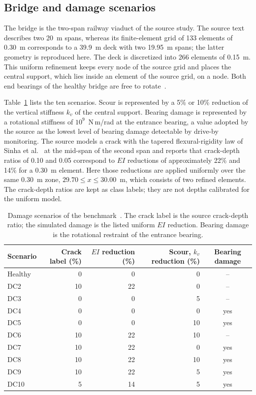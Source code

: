 \subsection{Bridge and damage scenarios}
\label{sec:scenarios}

The bridge is the two-span railway viaduct of the source study. The source text
describes two 20~m spans, whereas its finite-element grid of 133 elements of
0.30~m corresponds to a 39.9~m deck with two 19.95~m spans; the latter geometry
is reproduced here. The deck is discretized into 266 elements of 0.15~m. This
uniform refinement keeps every node of the source grid and places the central
support, which lies inside an element of the source grid, on a node. Both end
bearings of the healthy bridge are free to rotate~\cite{fernandes2025early}.

Table~\ref{tab:f25_scenarios} lists the ten scenarios. Scour is represented by a
5\% or 10\% reduction of the vertical stiffness $k_v$ of the central support.
Bearing damage is represented by a rotational stiffness of $10^{9}$~N\,m/rad at
the entrance bearing, a value adopted by the source as the lowest level of
bearing damage detectable by drive-by monitoring. The source models a crack
with the tapered flexural-rigidity law of Sinha et
al.~\cite{sinha2002simplified} at the mid-span of the second span and reports
that crack-depth ratios of 0.10 and 0.05 correspond to $EI$ reductions of
approximately 22\% and 14\% for a 0.30~m element. Here those reductions are
applied uniformly over the same 0.30~m zone, $29.70\le x\le30.00$~m, which
consists of two refined elements. The crack-depth ratios are kept as class
labels; they are not depths calibrated for the uniform model.

\begin{table}[htbp]
\centering
\caption{Damage scenarios of the benchmark~\cite{fernandes2025early}. The crack
label is the source crack-depth ratio; the simulated damage is the listed
uniform $EI$ reduction. Bearing damage is the rotational restraint of the
entrance bearing.}
\label{tab:f25_scenarios}
\small
\begin{tabular}{lrrrc}
\toprule
Scenario & Crack label (\%) & $EI$ reduction (\%) & Scour, $k_v$ reduction (\%) & Bearing damage \\
\midrule
Healthy & 0 & 0 & 0 & -- \\
DC2 & 10 & 22 & 0 & -- \\
DC3 & 0 & 0 & 5 & -- \\
DC4 & 0 & 0 & 0 & yes \\
DC5 & 0 & 0 & 10 & yes \\
DC6 & 10 & 22 & 10 & -- \\
DC7 & 10 & 22 & 0 & yes \\
DC8 & 10 & 22 & 10 & yes \\
DC9 & 10 & 22 & 5 & yes \\
DC10 & 5 & 14 & 5 & yes \\
\bottomrule
\end{tabular}
\end{table}


